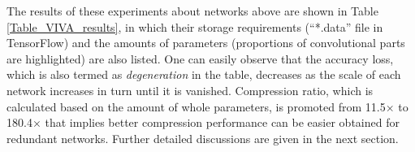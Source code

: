 \documentclass[a4paper,fleqn]{cas-dc}
\begin{document}
The results of these experiments about networks above are shown in Table \ref{Table_VIVA_results}, in which their storage requirements (``*.data'' file in TensorFlow) and the amounts of parameters (proportions of convolutional parts are highlighted) are also listed. One can easily observe that the accuracy loss, which is also termed as \emph{degeneration} in the table, decreases as the scale of each network increases in turn until it is vanished. Compression ratio, which is calculated based on the amount of whole parameters, is promoted from 11.5\(\times\) to 180.4\(\times\) that implies better compression performance can be easier obtained for redundant networks. Further detailed discussions are given in the next section.

\begin{table*}
\caption{\textbf{Experimental results on VIVA challenge dataset.} Note that the unit of degeneration ``pp'' means the percentage point and every decimal of degeneration is the difference value between the accuracy of the original network and its TT counterpart. ``Conv'' and ``Whole'' mean the number of parameters of convolutional part and whole network respectively.}
\label{Table_VIVA_results}
  \centering
  \renewcommand\arraystretch{1.6}
\end{table*}
\end{document}
